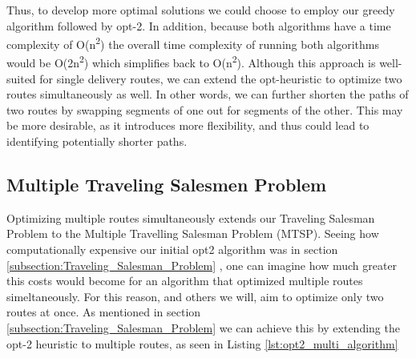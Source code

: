 \documentclass[letterpaper]{article}
\begin{document}
\begin{figure}[h]
\begin{minipage}{0.3\linewidth}
        \end{minipage}
    \end{figure}

    Thus, to develop more optimal solutions we could choose to employ our 
    greedy algorithm followed by opt-2. In addition, because both algorithms 
    have a time complexity of O(n\textsuperscript2) the overall time complexity of running 
    both algorithms would be O(2n\textsuperscript2) which simplifies back to O(n\textsuperscript2). 
    Although this approach is well-suited for single delivery routes, 
    we can extend the opt-heuristic to optimize two routes simultaneously 
    as well. In other words, we can further shorten the paths of two routes 
    by swapping segments of one out for segments of the other. This may be more 
    desirable, as it introduces more flexibility, and thus could lead to identifying 
    potentially shorter paths.



    \subsection{Multiple Traveling Salesmen Problem}
    \label{subsection:Multiple_Traveling_Salesmen_Problem}
    
    Optimizing multiple routes simultaneously extends our 
    Traveling Salesman Problem to the Multiple Travelling 
    Salesman Problem (MTSP). Seeing how computationally 
    expensive our initial opt2 algorithm was in section 
    \ref{subsection:Traveling_Salesman_Problem} , one can imagine how much greater 
    this costs would become for an algorithm that optimized 
    multiple routes simeltaneously. For this reason, and 
    others we will, aim to optimize only two routes at 
    once. As mentioned in section \ref{subsection:Traveling_Salesman_Problem} we can achieve this 
    by extending the opt-2 heuristic to multiple routes, as seen in Listing \ref{lst:opt2_multi_algorithm}
    
\end{document}

